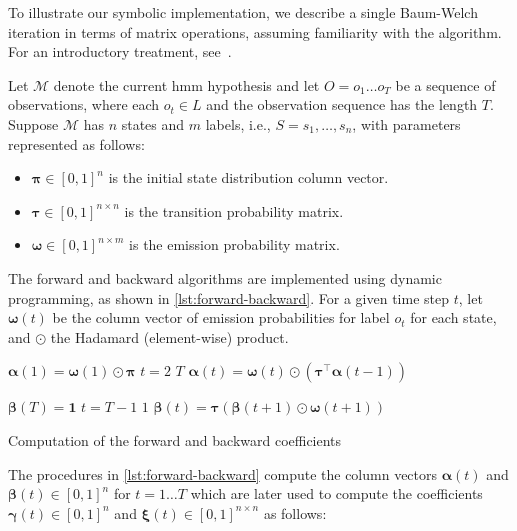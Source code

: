 To illustrate our symbolic implementation, we describe a single Baum-Welch iteration in terms of matrix operations, assuming familiarity with the algorithm. For an introductory treatment, see~\cite{Baum70,reynouard2024learning}.

Let $\mathcal{M}$ denote the current \gls{hmm} hypothesis and let $O = o_1 \dots o_T$ be a sequence of observations, where each $o_t \in L$ and the observation sequence has the length $T$. Suppose $\mathcal{M}$ has $n$ states and $m$ labels, i.e., $S = {s_1, \dots, s_n}$, with parameters represented as follows:


\begin{itemize}
    \item $\pmb{\pi} \in [0,1]^{n}$ is the initial state distribution column vector.
    \item $\pmb{\tau} \in [0,1]^{n \times n}$ is the transition probability matrix.
    \item $\pmb{\omega} \in [0,1]^{n \times m}$ is the emission probability matrix.
\end{itemize}


The forward and backward algorithms are implemented using dynamic programming, as shown in \autoref{lst:forward-backward}.
For a given time step $t$, let $\pmb{\omega}(t)$ be the column vector of emission probabilities for label $o_t$ for each state, and $\odot$ the Hadamard (element-wise) product.


\begin{listing}[htb!]
    \begin{codebox}
        \li $\pmb{\alpha}(1) = \pmb{\omega}(1) \odot \pmb{\pi}$
        \li \For $t = 2$ \To $T$ \Do
        \li $\pmb{\alpha}(t) = \pmb{\omega}(t) \odot \left( \pmb{\tau}^\top \pmb{\alpha}(t-1) \right)$
        \End
    \end{codebox}
    \begin{codebox}
        \li $\pmb{\beta}(T) = \mathbf{1}$
        \li \For $t = T-1$ \To $1$ \Do
        \li $\pmb{\beta}(t) = \pmb{\tau} \left( \pmb{\beta}(t+1) \odot \pmb{\omega}(t+1) \right)$
        \End
    \end{codebox}
    \caption{Computation of the forward and backward coefficients}
    \label{lst:forward-backward}
\end{listing}


The procedures in \autoref{lst:forward-backward} compute the column vectors $\pmb{\alpha}(t)$ and $\pmb{\beta}(t) \in [0,1]^{n}$ for $t = 1\dots T$ which are later used to compute the coefficients $\pmb{\gamma}(t) \in [0,1]^{n}$ and $\pmb{\xi}(t) \in [0,1]^{n \times n}$ as follows:

